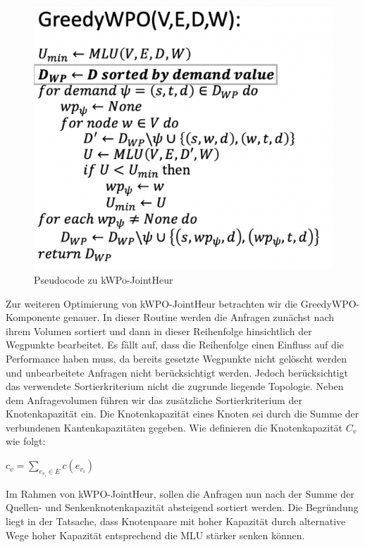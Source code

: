 \documentclass[sigconf,noacm,review]{acmart}
\begin{document}
\begin{figure}[h]
  \centering
  \includegraphics[width=\linewidth]{abbildungen/pseudo1}
  \caption{Pseudocode zu kWPo-JointHeur}
\end{figure}
Zur weiteren Optimierung von kWPO-JointHeur betrachten wir die GreedyWPO-Komponente genauer. In dieser Routine werden die Anfragen zunächst nach ihrem Volumen sortiert und dann in dieser Reihenfolge hinsichtlich der Wegpunkte bearbeitet. Es fällt auf, dass die Reihenfolge einen Einfluss auf die Performance haben muss, da bereits gesetzte Wegpunkte nicht gelöscht werden und unbearbeitete Anfragen nicht berücksichtigt werden. Jedoch berücksichtigt das verwendete Sortierkriterium nicht die zugrunde liegende Topologie.
Neben dem Anfragevolumen führen wir das zusätzliche Sortierkriterium der Knotenkapazität ein. Die Knotenkapazität eines Knoten sei durch die Summe der verbundenen Kantenkapazitäten gegeben.
Wie definieren die Knotenkapazität $C_v$ wie folgt: \begin{center} $c_v = \sum_{e_{v_{i}} \in E} c(e_{v_i})$\end{center}
Im Rahmen von kWPO-JointHeur, sollen die Anfragen nun nach der Summe der Quellen- und Senkenknotenkapazität absteigend sortiert werden. Die Begründung liegt in der Tatsache, dass Knotenpaare mit hoher Kapazität durch alternative Wege hoher Kapazität entsprechend die MLU stärker senken können.
\end{document}
